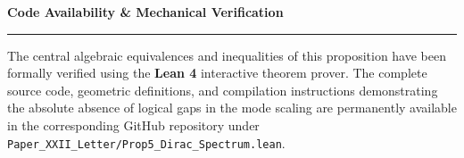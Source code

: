 \documentclass[12pt]{article}
\begin{document}
\vspace{2em}
\noindent\textbf{Code Availability \& Mechanical Verification}\\
\rule{\textwidth}{0.4pt}
The central algebraic equivalences and inequalities of this proposition have been formally verified using the \textbf{Lean 4} interactive theorem prover. The complete source code, geometric definitions, and compilation instructions demonstrating the absolute absence of logical gaps in the mode scaling are permanently available in the corresponding GitHub repository under \texttt{Paper\_XXII\_Letter/Prop5\_Dirac\_Spectrum.lean}.
\end{document}

